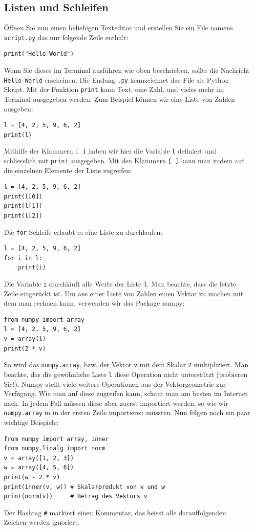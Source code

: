 \documentclass[12pt,a4paper]{article}
\theoremstyle{definition}
\theoremstyle{definition}
\begin{document}
\subsection{Listen und Schleifen}
Öffnen Sie nun einen beliebigen Texteditor und erstellen Sie ein File namens \texttt{script.py} das nur folgende Zeile enthält:
\begin{lstlisting}[style=python]
print("Hello World")
\end{lstlisting}
Wenn Sie dieses im Terminal ausführen wie oben beschrieben, sollte die Nachricht \texttt{Hello World} erscheinen.
Die Endung \texttt{.py} kennzeichnet das File als Python-Skript.
Mit der Funktion \texttt{print} kann Text, eine Zahl, und vieles mehr im Terminal ausgegeben werden.
Zum Beispiel können wir eine Liste von Zahlen ausgeben:
\begin{lstlisting}[style=python]
l = [4, 2, 5, 9, 6, 2]
print(l)
\end{lstlisting}
Mithilfe der Klammern \texttt{[ ]} haben wir hier die Variable \texttt{l} definiert und schliesslich mit \texttt{print} ausgegeben.
Mit den Klammern \texttt{[ ]} kann man zudem auf die einzelnen Elemente der Liste zugreifen:
\begin{lstlisting}[style=python]
l = [4, 2, 5, 9, 6, 2]
print(l[0])
print(l[1])
print(l[2])
\end{lstlisting}
Die \texttt{for} Schleife erlaubt es eine Liste zu durchlaufen:
\begin{lstlisting}[style=python]
l = [4, 2, 5, 9, 6, 2]
for i in l:
	print(i)
\end{lstlisting}
Die Variable \texttt{i} durchläuft alle Werte der Liste \texttt{l}.
Man beachte, dass die letzte Zeile eingerückt ist.
Um aus einer Liste von Zahlen einen Vektor zu machen mit dem man rechnen kann, verwenden wir das Package numpy:
\begin{lstlisting}[style=python]
from numpy import array
l = [4, 2, 5, 9, 6, 2]
v = array(l)
print(2 * v)
\end{lstlisting}
So wird das \texttt{numpy.array}, bzw. der Vektor \texttt{v} mit dem Skalar \texttt{2} multipliziert.
Man beachte, das die gewöhnliche Liste \texttt{l} diese Operation nicht unterstützt (probieren Sie!).
Numpy stellt viele weitere Operationen aus der Vektorgeometrie zur Verfügung.
Wie man auf diese zugreifen kann, schaut man am besten im Internet nach.
In jedem Fall müssen diese aber zuerst importiert werden, so wie wir \texttt{numpy.array} in in der ersten Zeile importieren mussten.
Nun folgen noch ein paar wichtige Beispiele:
\begin{lstlisting}[style=python]
from numpy import array, inner
from numpy.linalg import norm
v = array([1, 2, 3])
w = array([4, 5, 6])
print(w - 2 * v)
print(inner(v, w)) # Skalarprodukt von v und w
print(norm(v))     # Betrag des Vektors v
\end{lstlisting}
Der Hashtag \texttt{\#} markiert einen Kommentar, das heisst alle darauffolgenden Zeichen werden ignoriert.
\end{document}
